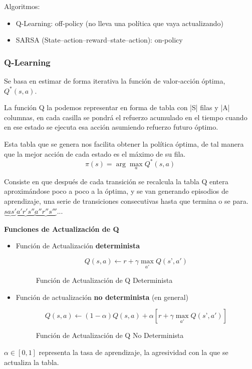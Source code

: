 \documentclass[12pt, twoside, openright]{report} %
\begin{document}
Algoritmos:
\begin{itemize}
  \item Q-Learning: off-policy (no lleva una política que vaya actualizando)
  \item SARSA (State–action–reward–state–action): on-policy
\end{itemize}

\subsubsection{Q-Learning}
Se basa en estimar de forma iterativa la función de valor-acción óptima, $Q^*(s, a)$. 

La función Q la podemos representar en forma de tabla con |S| filas y |A| columnas, en cada casilla se pondrá el refuerzo acumulado en el tiempo cuando en ese estado se ejecuta esa acción asumiendo refuerzo futuro óptimo.

Esta tabla que se genera nos facilita obtener la política óptima, de tal manera que la mejor acción de cada estado es el máximo de su fila.
$$\pi(s) = \arg \max _a Q^* (s, a)$$

Consiste en que después de cada transición se recalcula la tabla Q entera aproximándose poco a poco a la óptima, y se van generando episodios de aprendizaje, una serie de transiciones consecutivas hasta que termina o se para. $\underbrace{sas'} \underbrace{a'r's''} \underbrace{a''r''s'''}...$

\textbf{Funciones de Actualización de Q}
\begin{itemize}
  \item Función de Actualización \textbf{determinista}
  \begin{figure}[H]
    $$Q(s, a) \leftarrow r + \gamma \max_{a'} Q(s’, a')$$

    \captionsetup{justification=centering}
    \caption{Función de Actualización de Q Determinista}
  \end{figure}
  \item Función de actualización \textbf{no determinista} (en general)
  \begin{figure}[H]
    $$Q(s, a) \leftarrow (1-\alpha) Q(s, a) + \alpha[r + \gamma \max_{a'} Q(s’, a')]$$

    \captionsetup{justification=centering}
    \caption{Función de Actualización de Q No Determinista}
  \end{figure}
\end{itemize}

$\alpha \in [0,1]$ representa la tasa de aprendizaje, la agresividad con la que se actualiza la tabla.
\end{document}
